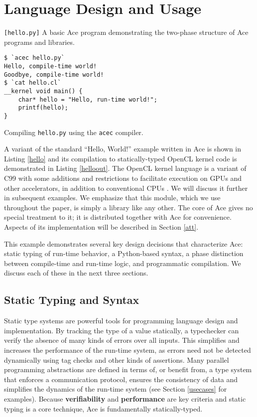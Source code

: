 \documentclass{sig-alternate}
\begin{document}
\section{Language Design and Usage}\label{usage}
\begin{codelisting}

\caption{\texttt{[hello.py]} A basic Ace program demonstrating the two-phase structure of Ace programs and libraries.}
\label{hello}
\end{codelisting}
\begin{codelisting}
\begin{lstlisting}[style=Bash]
$ `acec hello.py`
Hello, compile-time world!
Goodbye, compile-time world!
$ `cat hello.cl`
__kernel void main() {
    char* hello = "Hello, run-time world!";
    printf(hello);
}\end{lstlisting}
\caption{Compiling \texttt{hello.py} using the \texttt{acec} compiler.}
\label{helloout}
\end{codelisting}
A variant of the standard ``Hello, World!'' example written in Ace is shown in Listing \ref{hello} and its compilation to statically-typed OpenCL kernel code is demonstrated in Listing \ref{helloout}. The OpenCL kernel language is a variant of C99 with some additions and restrictions to facilitate execution on GPUs and other accelerators, in addition to conventional CPUs \cite{opencl}. We will discuss it further in subsequent examples.
We emphasize that this module, which we use throughout the paper, is simply a library like any other. The core of Ace gives no special treatment to it; it is distributed together with Ace for convenience. Aspects of its implementation will be described  in Section \ref{att}.

This example demonstrates several key design decisions that characterize Ace: static typing of run-time behavior, a Python-based syntax, a phase distinction between compile-time and run-time logic, and programmatic compilation. We discuss each of these in the next three sections. 
\subsection{Static Typing and Syntax}
Static type systems are powerful tools for programming language design and implementation. By tracking the type of a value statically, a typechecker can verify the absence of many kinds of errors over all inputs. This simplifies and increases the performance of the run-time system, as errors need not be detected dynamically using tag checks and other kinds of assertions. Many parallel programming abstractions are defined in terms of, or benefit from, a type system that enforces a communication protocol, ensures the consistency of data and simplifies the dynamics of the run-time system (see Section \ref{usecases} for examples). Because \textbf{verifiability} and \textbf{performance} are key criteria and static typing is a core technique, Ace is fundamentally statically-typed.
\end{document}
